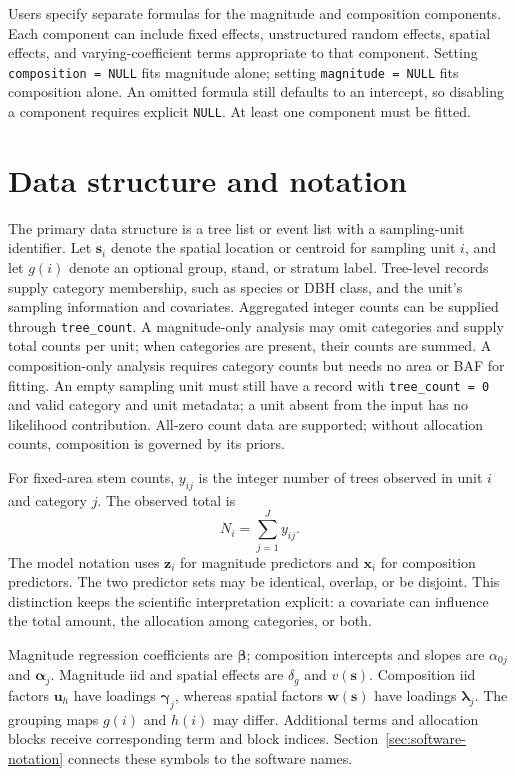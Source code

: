 \documentclass[11pt]{article}
\newcommand{\balpha}{\bm{\alpha}}
\newcommand{\bbeta}{\bm{\beta}}
\newcommand{\bgamma}{\bm{\gamma}}
\newcommand{\blambda}{\bm{\lambda}}
\newcommand{\bu}{\bm{u}}
\newcommand{\bw}{\bm{w}}
\newcommand{\bx}{\bm{x}}
\newcommand{\bz}{\bm{z}}
\newcommand{\bs}{\bm{s}}
\begin{document}
Users specify separate formulas for the magnitude and composition components. Each component can include fixed effects, unstructured
random effects, spatial effects, and varying-coefficient terms appropriate to
that component. Setting \texttt{composition = NULL} fits magnitude alone;
setting \texttt{magnitude = NULL} fits composition alone. An omitted formula
still defaults to an intercept, so disabling a component requires explicit
\texttt{NULL}. At least one component must be fitted.

\section{Data structure and notation}

The primary data structure is a tree list or event list with a sampling-unit
identifier. Let \(\bs_i\) denote the spatial location or centroid for sampling
unit \(i\), and let \(g(i)\) denote an optional group, stand, or stratum label.
Tree-level records supply category membership, such as species or DBH class,
and the unit's sampling information and covariates.
Aggregated integer counts can be supplied through \texttt{tree\_count}.
A magnitude-only analysis may omit categories and supply total counts per
unit; when categories are present, their counts are summed. A composition-only
analysis requires category counts but needs no area or BAF for fitting.
An empty sampling unit must still have a record with \texttt{tree\_count = 0}
and valid category and unit metadata; a unit absent from the input has no
likelihood contribution. All-zero count data are supported; without allocation
counts, composition is governed by its priors.

For fixed-area stem counts, \(y_{ij}\) is the integer number of trees observed
in unit \(i\) and category \(j\). The observed total is
\begin{equation}
  N_i = \sum_{j=1}^{J}y_{ij}.
  \label{eq:observed-total}
\end{equation}
The model notation uses \(\bz_i\) for magnitude predictors and \(\bx_i\) for
composition predictors. The two predictor sets may be identical, overlap, or be
disjoint. This distinction keeps the scientific interpretation explicit: a
covariate can influence the total amount, the allocation among categories, or
both.

Magnitude regression coefficients are \(\bbeta\); composition intercepts and slopes are
\(\alpha_{0j}\) and \(\balpha_j\). Magnitude iid and spatial effects are
\(\delta_g\) and \(v(\bs)\). Composition iid factors \(\bu_h\) have loadings
\(\bgamma_j\), whereas spatial factors \(\bw(\bs)\) have loadings
\(\blambda_j\). The grouping maps \(g(i)\) and \(h(i)\) may differ.
Additional terms and allocation blocks receive corresponding term and block
indices. Section~\ref{sec:software-notation} connects these symbols to the
software names.
\end{document}
